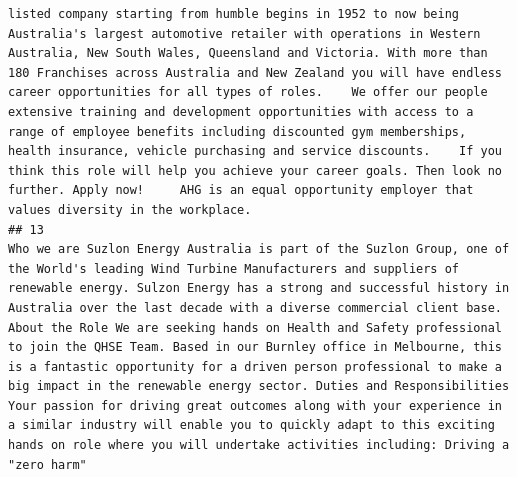 \documentclass[11pt,a4paper,]{article}
\begin{document}
\begin{verbatim}
listed company starting from humble begins in 1952 to now being Australia's largest automotive retailer with operations in Western Australia, New South Wales, Queensland and Victoria. With more than 180 Franchises across Australia and New Zealand you will have endless career opportunities for all types of roles.    We offer our people extensive training and development opportunities with access to a range of employee benefits including discounted gym memberships, health insurance, vehicle purchasing and service discounts.    If you think this role will help you achieve your career goals. Then look no further. Apply now!     AHG is an equal opportunity employer that values diversity in the workplace. 
## 13                                                                                                                                                                                                                                                                                                                                                                                                                                                                                                                                                                                                                                                                                                                                                                                                                                                                                                                                                                                                                                                                                                                                                                                                                                                                                                                                                                                                                                                                                                                                                                                                                                                                                                                                                                                                                                                                                               Who we are Suzlon Energy Australia is part of the Suzlon Group, one of the World's leading Wind Turbine Manufacturers and suppliers of renewable energy. Sulzon Energy has a strong and successful history in Australia over the last decade with a diverse commercial client base. About the Role We are seeking hands on Health and Safety professional to join the QHSE Team. Based in our Burnley office in Melbourne, this is a fantastic opportunity for a driven person professional to make a big impact in the renewable energy sector. Duties and Responsibilities Your passion for driving great outcomes along with your experience in a similar industry will enable you to quickly adapt to this exciting hands on role where you will undertake activities including: Driving a "zero harm" 
\end{verbatim}
\end{document}

